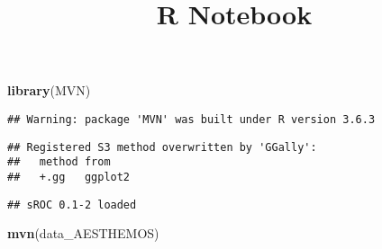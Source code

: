 \documentclass[
]{article}
\title{R Notebook}
\author{}
\date{\vspace{-2.5em}}
\newenvironment{Shaded}{\begin{snugshade}}{\end{snugshade}}
\newcommand{\KeywordTok}[1]{\textcolor[rgb]{0.13,0.29,0.53}{\textbf{#1}}}
\newcommand{\NormalTok}[1]{#1}
\begin{document}
\maketitle

\begin{Shaded}
\begin{Highlighting}[]
\KeywordTok{library}\NormalTok{(MVN)}
\end{Highlighting}
\end{Shaded}

\begin{verbatim}
## Warning: package 'MVN' was built under R version 3.6.3
\end{verbatim}

\begin{verbatim}
## Registered S3 method overwritten by 'GGally':
##   method from   
##   +.gg   ggplot2
\end{verbatim}

\begin{verbatim}
## sROC 0.1-2 loaded
\end{verbatim}

\begin{Shaded}
\begin{Highlighting}[]
\KeywordTok{mvn}\NormalTok{(data\_AESTHEMOS)}
\end{Highlighting}
\end{Shaded}
\end{document}
